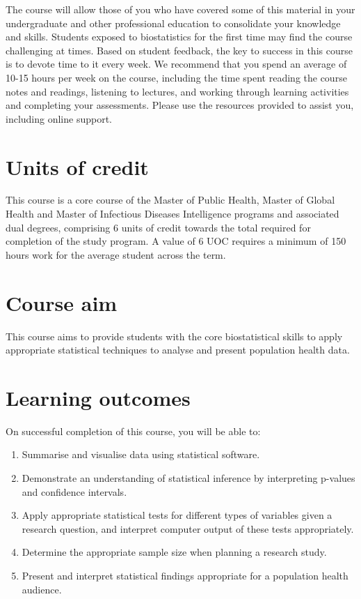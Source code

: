 \documentclass[
]{memoir}
\providecommand{\tightlist}{%
  \setlength{\itemsep}{0pt}\setlength{\parskip}{0pt}}
\begin{document}
The course will allow those of you who have covered some of this material in your undergraduate and other professional education to consolidate your knowledge and skills. Students exposed to biostatistics for the first time may find the course challenging at times. Based on student feedback, the key to success in this course is to devote time to it every week. We recommend that you spend an average of 10-15 hours per week on the course, including the time spent reading the course notes and readings, listening to lectures, and working through learning activities and completing your assessments. Please use the resources provided to assist you, including online support.

\hypertarget{units-of-credit}{%
\section*{Units of credit}\label{units-of-credit}}

This course is a core course of the Master of Public Health, Master of Global Health and Master of Infectious Diseases Intelligence programs and associated dual degrees, comprising 6 units of credit towards the total required for completion of the study program. A value of 6 UOC requires a minimum of 150 hours work for the average student across the term.

\hypertarget{course-aim}{%
\section*{Course aim}\label{course-aim}}

This course aims to provide students with the core biostatistical skills to apply appropriate statistical techniques to analyse and present population health data.

\hypertarget{learning-outcomes}{%
\section*{Learning outcomes}\label{learning-outcomes}}

On successful completion of this course, you will be able to:

\begin{enumerate}
\def\labelenumi{\arabic{enumi}.}
\tightlist
\item
  Summarise and visualise data using statistical software.
\item
  Demonstrate an understanding of statistical inference by interpreting p-values and confidence intervals.
\item
  Apply appropriate statistical tests for different types of variables given a research question, and interpret computer output of these tests appropriately.
\item
  Determine the appropriate sample size when planning a research study.
\item
  Present and interpret statistical findings appropriate for a population health audience.
\end{enumerate}
\end{document}

